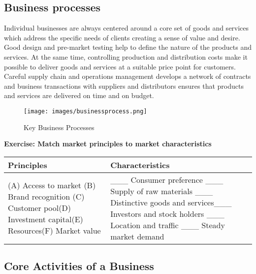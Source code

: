 \documentclass[]{book}
\let\BeginKnitrBlock\begin \let\EndKnitrBlock\end
\begin{document}
\hypertarget{business-processes}{%
\subsection{Business processes}\label{business-processes}}

Individual businesses are always centered around a core set of goods and services which address the specific needs of clients creating a sense of value and desire. Good design and pre-market testing help to define the nature of the products and services. At the same time, controlling production and distribution costs make it possible to deliver goods and services at a suitable price point for customers. Careful supply chain and operations management develops a network of contracts and business transactions with suppliers and distributors ensures that products and services are delivered on time and on budget.

\begin{figure}
\centering
\texttt{[image: images/businessprocess.png]}
\caption{Key Business Processes}
\end{figure}

\BeginKnitrBlock{rmdexercise}
\textbf{Exercise: Match market principles to market characteristics}

\begin{longtable}[]{@{}ll@{}}
\toprule
\begin{minipage}[b]{0.44\columnwidth}\raggedright
Principles\strut
\end{minipage} & \begin{minipage}[b]{0.50\columnwidth}\raggedright
Characteristics\strut
\end{minipage}\tabularnewline
\midrule
\endhead
\begin{minipage}[t]{0.44\columnwidth}\raggedright
(A) Access to market (B) Brand recognition (C) Customer pool(D) Investment capital(E) Resources(F) Market value\strut
\end{minipage} & \begin{minipage}[t]{0.50\columnwidth}\raggedright
\_\_\_ Consumer preference \_\_\_ Supply of raw materials \_\_\_ Distinctive goods and services\_\_\_ Investors and stock holders \_\_\_ Location and traffic \_\_\_ Steady market demand\strut
\end{minipage}\tabularnewline
\bottomrule
\end{longtable}
\EndKnitrBlock{rmdexercise}

\hypertarget{core-activities-of-a-business}{%
\subsection{Core Activities of a Business}\label{core-activities-of-a-business}}
\end{document}

